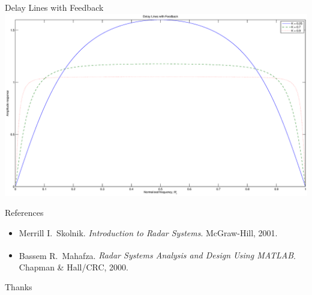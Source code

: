 \documentclass[mathserif]{beamer}
\begin{document}
    
    \begin{frame}{Delay Lines with Feedback}
      \includegraphics[width=\linewidth]{dlFeedback}
    \end{frame}
    
    
    \begin{frame}{References}
        
        \begin{itemize}
                 \item Merrill I.~Skolnik. \emph{Introduction to Radar Systems}. McGraw-Hill, 2001.
                 \item Bassem R.~Mahafza. \emph{Radar Systems Analysis and Design Using MATLAB\textsuperscript{\textregistered}}. Chapman \& Hall/CRC, 2000.
                 
        \end{itemize}
    \end{frame}
    
    
    \begin{frame}[c]
     \begin{center}
       \Huge Thanks
     \end{center}
    \end{frame}

    
\end{document}
